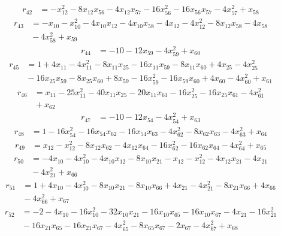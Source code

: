 \[\begin{aligned}
r_{42}&=-x_{12}^{2}-8x_{12}x_{56}-4x_{12}x_{57}-16x_{56}^{2}-16x_{56}x_{57}-4x_{57}^{2}+x_{58}
\end{aligned}\]
\[\begin{aligned}
r_{43}&=-x_{10}-x_{10}^{2}-4x_{10}x_{12}-4x_{10}x_{58}-4x_{12}-4x_{12}^{2}-8x_{12}x_{58}-4x_{58}\\
&{}-4x_{58}^{2}+x_{59}
\end{aligned}\]
\[\begin{aligned}
r_{44}&=-10-12x_{59}-4x_{59}^{2}+x_{60}
\end{aligned}\]
\[\begin{aligned}
r_{45}&=1+4x_{11}-4x_{11}^{2}-8x_{11}x_{25}-16x_{11}x_{59}-8x_{11}x_{60}+4x_{25}-4x_{25}^{2}\\
&{}-16x_{25}x_{59}-8x_{25}x_{60}+8x_{59}-16x_{59}^{2}-16x_{59}x_{60}+4x_{60}-4x_{60}^{2}+x_{61}
\end{aligned}\]
\[\begin{aligned}
r_{46}&=x_{11}-25x_{11}^{2}-40x_{11}x_{25}-20x_{11}x_{61}-16x_{25}^{2}-16x_{25}x_{61}-4x_{61}^{2}\\
&{}+x_{62}
\end{aligned}\]
\[\begin{aligned}
r_{47}&=-10-12x_{54}-4x_{54}^{2}+x_{63}
\end{aligned}\]
\[\begin{aligned}
r_{48}&=1-16x_{54}^{2}-16x_{54}x_{62}-16x_{54}x_{63}-4x_{62}^{2}-8x_{62}x_{63}-4x_{63}^{2}+x_{64}
\end{aligned}\]
\[\begin{aligned}
r_{49}&=x_{12}-x_{12}^{2}-8x_{12}x_{62}-4x_{12}x_{64}-16x_{62}^{2}-16x_{62}x_{64}-4x_{64}^{2}+x_{65}
\end{aligned}\]
\[\begin{aligned}
r_{50}&=-4x_{10}-4x_{10}^{2}-4x_{10}x_{12}-8x_{10}x_{21}-x_{12}-x_{12}^{2}-4x_{12}x_{21}-4x_{21}\\
&{}-4x_{21}^{2}+x_{66}
\end{aligned}\]
\[\begin{aligned}
r_{51}&=1+4x_{10}-4x_{10}^{2}-8x_{10}x_{21}-8x_{10}x_{66}+4x_{21}-4x_{21}^{2}-8x_{21}x_{66}+4x_{66}\\
&{}-4x_{66}^{2}+x_{67}
\end{aligned}\]
\[\begin{aligned}
r_{52}&=-2-4x_{10}-16x_{10}^{2}-32x_{10}x_{21}-16x_{10}x_{65}-16x_{10}x_{67}-4x_{21}-16x_{21}^{2}\\
&{}-16x_{21}x_{65}-16x_{21}x_{67}-4x_{65}^{2}-8x_{65}x_{67}-2x_{67}-4x_{67}^{2}+x_{68}
\end{aligned}\]
